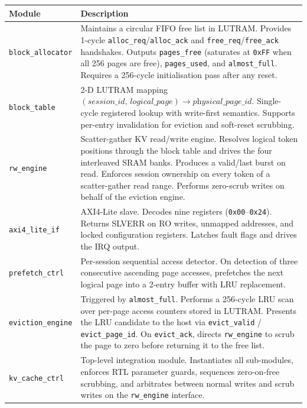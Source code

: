 \documentclass[10pt, a4paper]{article}
\newcommand{\hex}[1]{\texttt{0x#1}}
\newcommand{\portname}[1]{\texttt{#1}}
\begin{document}
\renewcommand{\arraystretch}{1.35}
\begin{tabularx}{\linewidth}{L{3.2cm} X}
\toprule
\textbf{Module} & \textbf{Description} \\
\midrule
\texttt{block\_allocator}  &
  Maintains a circular FIFO free list in LUTRAM. Provides 1-cycle
  \portname{alloc\_req}/\portname{alloc\_ack} and
  \portname{free\_req}/\portname{free\_ack} handshakes. Outputs
  \portname{pages\_free} (saturates at \hex{FF} when all 256 pages
  are free), \portname{pages\_used}, and \portname{almost\_full}.
  Requires a 256-cycle initialisation pass after any reset. \\
\addlinespace
\texttt{block\_table}  &
  2-D LUTRAM mapping $(\textit{session\_id},\,\textit{logical\_page})
  \rightarrow \textit{physical\_page\_id}$. Single-cycle registered lookup
  with write-first semantics. Supports per-entry invalidation for eviction
  and soft-reset scrubbing. \\
\addlinespace
\texttt{rw\_engine}  &
  Scatter-gather KV read/write engine. Resolves logical token positions
  through the block table and drives the four interleaved SRAM banks.
  Produces a valid/last burst on read. Enforces session ownership on
  every token of a scatter-gather read range. Performs zero-scrub writes
  on behalf of the eviction engine. \\
\addlinespace
\texttt{axi4\_lite\_if}  &
  AXI4-Lite slave. Decodes nine registers (\hex{00}–\hex{24}). Returns
  SLVERR on RO writes, unmapped addresses, and locked configuration
  registers. Latches fault flags and drives the IRQ output. \\
\addlinespace
\texttt{prefetch\_ctrl}  &
  Per-session sequential access detector. On detection of three
  consecutive ascending page accesses, prefetches the next logical page
  into a 2-entry buffer with LRU replacement. \\
\addlinespace
\texttt{eviction\_engine}  &
  Triggered by \portname{almost\_full}. Performs a 256-cycle LRU scan
  over per-page access counters stored in LUTRAM. Presents the LRU
  candidate to the host via \portname{evict\_valid} / \portname{evict\_page\_id}.
  On \portname{evict\_ack}, directs \texttt{rw\_engine} to scrub the
  page to zero before returning it to the free list. \\
\addlinespace
\texttt{kv\_cache\_ctrl}  &
  Top-level integration module. Instantiates all sub-modules, enforces
  RTL parameter guards, sequences zero-on-free scrubbing,
  and arbitrates between normal writes and scrub writes on the
  \texttt{rw\_engine} interface. \\
\bottomrule
\end{tabularx}
\end{document}
